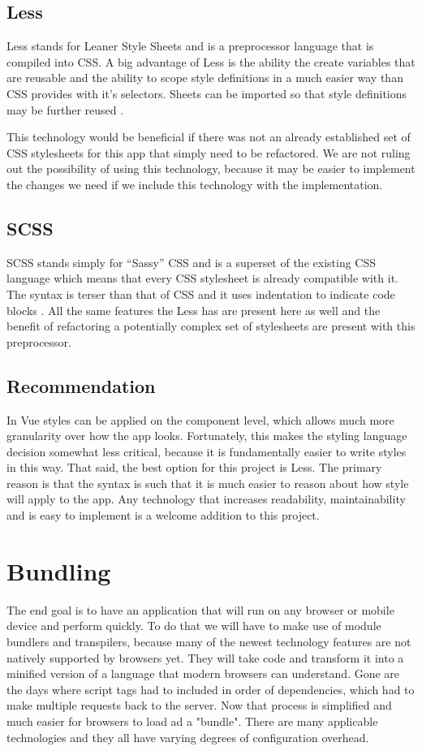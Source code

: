     \subsection{Less}
    Less stands for Leaner Style Sheets and is a preprocessor language that is compiled into CSS. A big advantage of Less is the ability the create variables that are reusable and the ability to scope style definitions in a much easier way than CSS provides with it’s selectors. Sheets can be imported so that style definitions may be further reused \cite{less}. 
    
    This technology would be beneficial if there was not an already established set of CSS stylesheets for this app that simply need to be refactored. We are not ruling out the possibility of using this technology, because it may be easier to implement the changes we need if we include this technology with the implementation.
    
    \subsection{SCSS}
    SCSS stands simply for “Sassy” CSS and is a superset of the existing CSS language which means that every CSS stylesheet is already compatible with it. The syntax is terser than that of CSS and it uses indentation to indicate code blocks \cite{sass}. All the same features the Less has are present here as well and the benefit of refactoring a potentially complex set of stylesheets are present with this preprocessor. 
    
    \subsection{Recommendation}
    In Vue styles can be applied on the component level, which allows much more granularity over how the app looks. Fortunately, this makes the styling language decision somewhat less critical, because it is fundamentally easier to write styles in this way. That said, the best option for this project is Less. The primary reason is that the syntax is such that it is much easier to reason about how style will apply to the app. Any technology that increases readability, maintainability and is easy to implement is a welcome addition to this project.
    
\section{Bundling}
The end goal is to have an application that will run on any browser or mobile device and perform quickly. To do that we will have to make use of module bundlers and transpilers, because many of the newest technology features are not natively supported by browsers yet. They will take code and transform it into a minified version of a language that modern browsers can understand. Gone are the days where script tags had to included in order of dependencies, which had to make multiple requests back to the server. Now that process is simplified and much easier for browsers to load ad a "bundle". There are many applicable technologies and they all have varying degrees of configuration overhead. 
